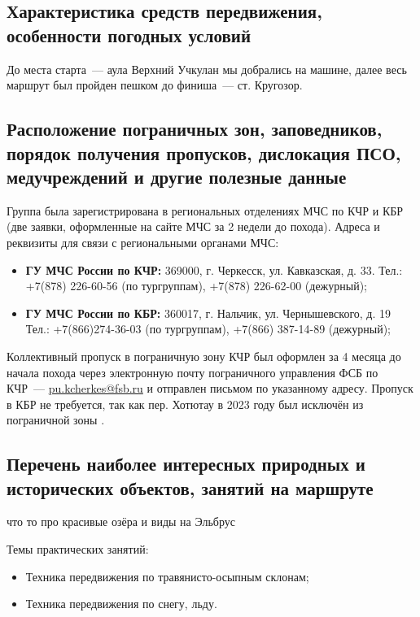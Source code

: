 \subsection{Характеристика средств передвижения, особенности погодных условий}

До места старта~--- аула Верхний Учкулан мы добрались на машине, далее весь маршрут был пройден пешком до финиша~--- ст. Кругозор.

\subsection{Расположение пограничных зон, заповедников, порядок получения пропусков, дислокация ПСО, медучреждений и другие полезные данные}

Группа была зарегистрирована в региональных отделениях МЧС по КЧР и КБР (две заявки, оформленные на сайте МЧС за 2 недели до похода).
Адреса и реквизиты для связи с региональными органами МЧС:
\begin{itemize}
	\item \textbf{ГУ МЧС России по КЧР:} 369000, г. Черкесск, ул. Кавказская, д. 33.
	Тел.: +7(878) 226-60-56 (по тургруппам), +7(878) 226-62-00 (дежурный);
	
	\item \textbf{ГУ МЧС России по КБР:} 360017, г. Нальчик, ул. Чернышевского, д. 19
	Тел.: +7(866)274-36-03 (по тургруппам), +7(866) 387-14-89 (дежурный);
	
\end{itemize}
Коллективный пропуск в пограничную зону КЧР был оформлен за 4 месяца до начала похода через электронную почту пограничного управления ФСБ по КЧР~--- \href{mailto: pu.kcherkes@fsb.ru}{pu.kcherkes@fsb.ru} и отправлен письмом по указанному адресу. Пропуск в КБР не требуется, так как пер. Хотютау в 2023 году был исключён из пограничной зоны \cite{order_kbr}.

\subsection{Перечень наиболее интересных природных и исторических объектов, занятий на маршруте}
что то про красивые озёра и виды на Эльбрус

Темы практических занятий:
\begin{itemize}
	\item Техника передвижения по травянисто-осыпным склонам;
	\item Техника передвижения по снегу, льду.
\end{itemize}



\newpage